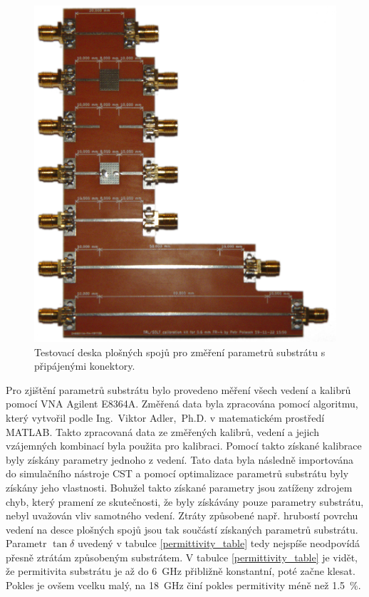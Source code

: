 \begin{figure}[htbp]
\includegraphics[width=\textwidth,keepaspectratio]{images/measurements/uoml.jpg}\caption{Testovací deska plošných spojů pro změření parametrů substrátu s připájenými konektory.}\label{uoml}
\end{figure}

Pro zjištění parametrů substrátu bylo provedeno měření všech vedení a kalibrů pomocí \acrshort{VNA} Agilent E8364A. Změřená data byla zpracována pomocí algoritmu, který vytvořil podle \cite{TRL_calibration} Ing.~Viktor Adler,~Ph.D. v matematickém prostředí MATLAB. Takto zpracovaná data ze změřených kalibrů, vedení a jejich vzájemných kombinací byla použita pro kalibraci. Pomocí takto získané kalibrace byly získány parametry jednoho z vedení. Tato data byla následně importována do simulačního nástroje CST a pomocí optimalizace parametrů substrátu byly získány jeho vlastnosti. Bohužel takto získané parametry jsou zatíženy zdrojem chyb, který pramení ze skutečnosti, že byly získávány pouze parametry substrátu, nebyl uvažován vliv samotného vedení. Ztráty způsobené např. hrubostí povrchu vedení na desce plošných spojů jsou tak součástí získaných parametrů substrátu. Parametr $\tan \delta$ uvedený v tabulce \ref{permittivity_table} tedy nejspíše neodpovídá přesně ztrátám způsobeným substrátem. V tabulce \ref{permittivity_table} je vidět, že permitivita substrátu je až do \SI{6}{\giga\hertz} přibližně konstantní, poté začne klesat. Pokles je ovšem vcelku malý, na \SI{18}{\giga\hertz} činí pokles permitivity méně než \SI{1.5}{\percent}.

